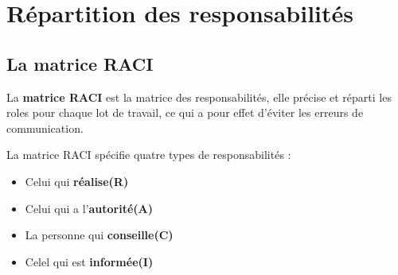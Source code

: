 \section{Répartition des responsabilités}

\subsection{La matrice RACI}
La \textbf{matrice RACI} est la matrice des responsabilités, elle précise et réparti les roles pour chaque lot de travail, ce qui a pour effet d'éviter les erreurs de communication.

La matrice RACI spécifie quatre types de responsabilités : 
\begin{itemize}
	\item Celui qui \textbf{réalise(R)}
	\item Celui qui a l'\textbf{autorité(A)}
	\item La personne qui \textbf{conseille(C)}
	\item Celel qui est \textbf{informée(I)}
\end{itemize}
